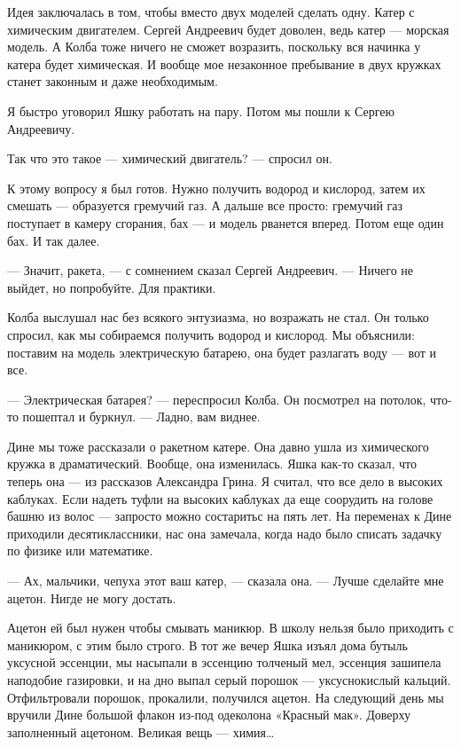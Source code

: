 Идея заключалась в том,  чтобы вместо двух моделей  сделать одну. Катер  с
химическим двигателем.  Сергей  Андреевич  будет  доволен,  ведь  катер  —
морская модель. А  Колба тоже  ничего не сможет  возразить, поскольку  вся
начинка у катера будет  химическая. И вообще  мое незаконное пребывание  в
двух кружках станет законным и даже необходимым.

Я быстро  уговорил  Яшку  работать  на  пару.  Потом  мы  пошли  к  Сергею
Андреевичу.

Так что это такое — химический двигатель? — спросил он.

К этому вопросу я был готов.  Нужно получить водород и кислород, затем  их
смешать —  образуется гремучий  газ.  А дальше  все просто:  гремучий  газ
поступает в камеру  сгорания, бах —  и модель рванется  вперед. Потом  еще
один бах. И так далее.

— Значит,  ракета, —  с сомнением  сказал Сергей  Андреевич. —  Ничего  не
выйдет, но попробуйте. Для практики.

Колба выслушал нас без всякого энтузиазма, но возражать не стал. Он только
спросил, как  мы собираемся  получить водород  и кислород.  Мы  объяснили:
поставим на модель электрическую батарею, она будет разлагать воду — вот и
все.

— Электрическая батарея?  — переспросил  Колба. Он  посмотрел на  потолок,
что-то пошептал и буркнул. — Ладно, вам виднее.

Дине мы тоже рассказали о ракетном  катере. Она давно ушла из  химического
кружка в драматический.  Вообще, она изменилась.  Яшка как-то сказал,  что
теперь она  — из  рассказов Александра  Грина. Я  считал, что  все дело  в
высоких каблуках. Если надеть туфли  на высоких каблуках да еще  соорудить
на голове  башню из  волос —  запросто можно  состаритьс на  пять лет.  На
переменах к Дине приходили десятиклассники,  нас она замечала, когда  надо
было списать задачку по физике или математике.

— Ах, мальчики, чепуха этот ваш катер, — сказала она. — Лучше сделайте мне
ацетон. Нигде не могу достать.

Ацетон ей был нужен чтобы смывать маникюр. В школу нельзя было приходить с
маникюром, с  этим было  строго. В  тот же  вечер Яшка  изъял дома  бутыль
уксусной эссенции, мы насыпали в эссенцию толченый мел, эссенция  зашипела
наподобие газировки, и на дно выпал серый порошок — уксуснокислый кальций.
Отфильтровали порошок, прокалили, получился  ацетон. На следующий день  мы
вручили Дине  большой  флакон  из-под  одеколона  «Красный  мак».  Доверху
заполненный ацетоном. Великая вещь — химия…

